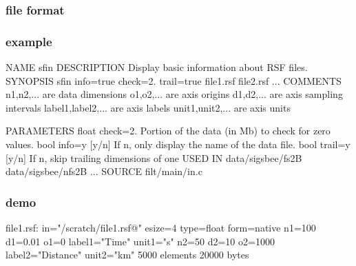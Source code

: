
\begin{frame} \frametitle{file format}
\end{frame}
\cwpnote{}

\begin{frame}[fragile] \frametitle{example}

  \tiny
  \begin{semiverbatim}
NAME
        sfin
DESCRIPTION
        Display basic information about RSF files.
SYNOPSIS
        sfin info=true check=2. trail=true file1.rsf file2.rsf ...
COMMENTS
        n1,n2,... are data dimensions
        o1,o2,... are axis origins
        d1,d2,... are axis sampling intervals
        label1,label2,... are axis labels
        unit1,unit2,... are axis units

PARAMETERS
        float   check=2.        Portion of the data (in Mb) to check for zero values.
        bool    info=y [y/n]    If n, only display the name of the data file.
        bool    trail=y [y/n]   If n, skip trailing dimensions of  one
USED IN
        data/sigsbee/fs2B
        data/sigsbee/nfs2B
	...
SOURCE
        filt/main/in.c
\end{semiverbatim}
\end{frame}
\cwpnote{}

\begin{frame}[fragile] \frametitle{demo}

  \vfill
  \tiny
\begin{semiverbatim}
file1.rsf:
    in="/scratch/file1.rsf@"
    esize=4 type=float form=native
    n1=100         d1=0.01        o1=0          label1="Time" unit1="s"
    n2=50          d2=10          o2=1000       label2="Distance" unit2="km"
        5000 elements 20000 bytes
\end{semiverbatim}
\end{frame}
\cwpnote{}

